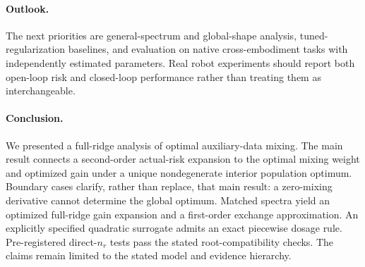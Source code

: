 \paragraph{Outlook.}
The next priorities are general-spectrum and global-shape analysis, tuned-regularization baselines, and evaluation on native cross-embodiment tasks with independently estimated parameters. Real robot experiments should report both open-loop risk and closed-loop performance rather than treating them as interchangeable.

\paragraph{Conclusion.}
We presented a full-ridge analysis of optimal auxiliary-data mixing. The main result connects a second-order actual-risk expansion to the optimal mixing weight and optimized gain under a unique nondegenerate interior population optimum. Boundary cases clarify, rather than replace, that main result: a zero-mixing derivative cannot determine the global optimum. Matched spectra yield an optimized full-ridge gain expansion and a first-order exchange approximation. An explicitly specified quadratic surrogate admits an exact piecewise dosage rule. Pre-registered direct-$n_r$ tests pass the stated root-compatibility checks. The claims remain limited to the stated model and evidence hierarchy.
